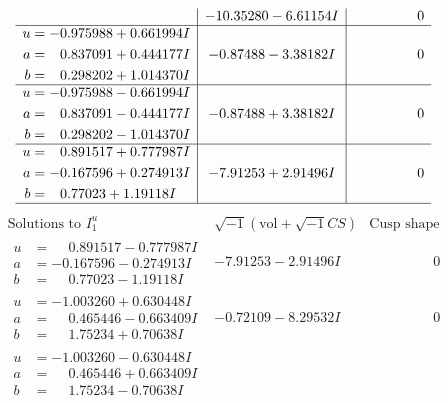 \documentclass[1p]{elsarticle_modified}
\theoremstyle{definition}
\newcommand{\I}{\sqrt{-1}}
\begin{document}
$$\begin{array}{c|c|c}
 & -10.35280 - 6.61154 I & \phantom{-0.000000 } 0 \\ \hline\begin{aligned}
u &= -0.975988 + 0.661994 I \\
a &= \phantom{-}0.837091 + 0.444177 I \\
b &= \phantom{-}0.298202 + 1.014370 I\end{aligned}
 & -0.87488 - 3.38182 I & \phantom{-0.000000 } 0 \\ \hline\begin{aligned}
u &= -0.975988 - 0.661994 I \\
a &= \phantom{-}0.837091 - 0.444177 I \\
b &= \phantom{-}0.298202 - 1.014370 I\end{aligned}
 & -0.87488 + 3.38182 I & \phantom{-0.000000 } 0 \\ \hline\begin{aligned}
u &= \phantom{-}0.891517 + 0.777987 I \\
a &= -0.167596 + 0.274913 I \\
b &= \phantom{-}0.77023 + 1.19118 I\end{aligned}
 & -7.91253 + 2.91496 I & \phantom{-0.000000 } 0\\
 \hline 
 \end{array}$$\newpage$$\begin{array}{c|c|c}  
\text{Solutions to }I^u_{1}& \I (\text{vol} + \sqrt{-1}CS) & \text{Cusp shape}\\
 \hline 
\begin{aligned}
u &= \phantom{-}0.891517 - 0.777987 I \\
a &= -0.167596 - 0.274913 I \\
b &= \phantom{-}0.77023 - 1.19118 I\end{aligned}
 & -7.91253 - 2.91496 I & \phantom{-0.000000 } 0 \\ \hline\begin{aligned}
u &= -1.003260 + 0.630448 I \\
a &= \phantom{-}0.465446 - 0.663409 I \\
b &= \phantom{-}1.75234 + 0.70638 I\end{aligned}
 & -0.72109 - 8.29532 I & \phantom{-0.000000 } 0 \\ \hline\begin{aligned}
u &= -1.003260 - 0.630448 I \\
a &= \phantom{-}0.465446 + 0.663409 I \\
b &= \phantom{-}1.75234 - 0.70638 I\end{aligned}

\end{array}$$
\end{document}

